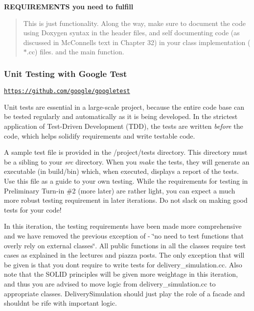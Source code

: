 {\bfseries R\+E\+Q\+U\+I\+R\+E\+M\+E\+N\+TS you need to fulfill}

\begin{quote}
This is just functionality. Along the way, make sure to document the code using Doxygen syntax in the header files, and self documenting code (as discussed in Mc\+Connell\textquotesingle{}s text in Chapter 32) in your class implementation ($\ast$.cc) files. and the main function. \end{quote}


\subsubsection*{Unit Testing with Google Test}

\href{https://github.com/google/googletest}{\tt https\+://github.\+com/google/googletest}

Unit tests are essential in a large-\/scale project, because the entire code base can be tested regularly and automatically as it is being developed. In the strictest application of Test-\/\+Driven Development (T\+DD), the tests are written {\itshape before} the code, which helps solidify requirements and write testable code.

A sample test file is provided in the /project/tests directory. This directory must be a sibling to your {\itshape src} directory. When you {\itshape make} the tests, they will generate an executable (in build/bin) which, when executed, displays a report of the tests. Use this file as a guide to your own testing. While the requirements for testing in Preliminary Turn-\/in \#2 (more later) are rather light, you can expect a much more robust testing requirement in later iterations. Do not slack on making good tests for your code!

In this iteration, the testing requirements have been made more comprehensive and we have removed the previous exception of -\/ \char`\"{}no need to test functions that overly rely on external classes\char`\"{}. All public functions in all the classes require test cases as explained in the lectures and piazza posts. The only exception that will be given is that you don\textquotesingle{}t require to write tests for delivery\+\_\+simulation.\+cc. Also note that the S\+O\+L\+ID principles will be given more weightage in this iteration, and thus you are advised to move logic from delivery\+\_\+simulation.\+cc to appropriate classes. Delivery\+Simulation should just play the role of a facade and shouldn\textquotesingle{}t be rife with important logic.

